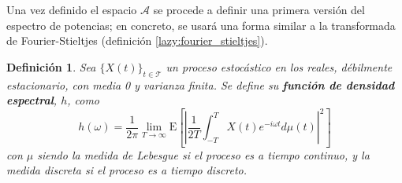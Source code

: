 \documentclass[12pt,letterpaper]{book}
\newtheorem{definicion}{Definición}[chapter]
\newcommand{\Z}{\mathbb{Z}}
\newcommand{\E}[1]{\mathrm{E}\left[ #1 \right]}
\newcommand{\abso}[1]{\left| #1 \right|}
\newcommand{\xt}{$\{X(t)\}_{t\in \mathcal{T}}$ }
\begin{document}
Una vez definido el espacio $\mathcal{A}$ se procede a definir una primera versión del espectro de potencias; en concreto, se usará una forma similar a la transformada de Fourier-Stieltjes (definición \ref{lazy:fourier_stieltjes}).


\begin{definicion}%
Sea \xt un proceso estocástico en los reales, débilmente estacionario, con media 0 y varianza finita. Se define su \textbf{función de densidad espectral}, $h$, como
\begin{equation}
h(\omega) = \frac{1}{2 \pi} \lim_{T\rightarrow \infty} \E{ \abso{ \frac{1}{2T} \int_{-T}^{T} X(t) e^{-i \omega t} d\mu(t)}^{2} }
\end{equation}
con $\mu$ siendo la medida de Lebesgue si el proceso es a tiempo continuo, y la medida discreta si el proceso es a tiempo discreto.
\label{txt_FDE_cont}
\end{definicion}


\end{document}
